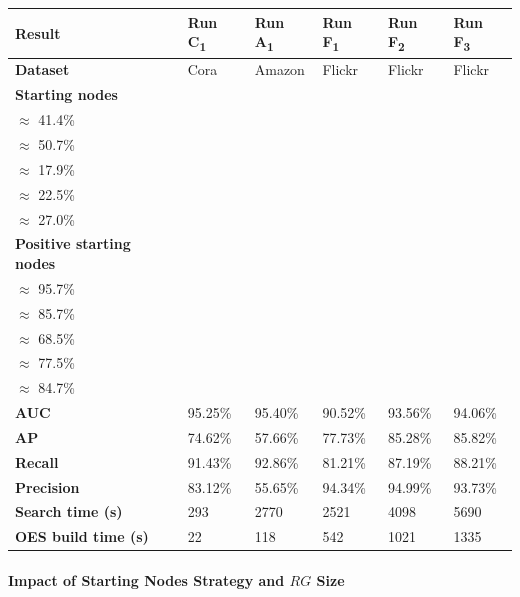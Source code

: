 \documentclass[pdflatex,sn-mathphys-num]{sn-jnl}%
\renewenvironment{table}[1][]%
{\tableorg[#1]%
\tablebodyfont%
\renewcommand\footnotetext[2][]{{\removelastskip\vskip0pt%
\let\tablebodyfont\tablefootnotefont%
\hskip0pt\if!##1!\else{\smash{$^{##1}$}}\fi##2\par}}%
}{\endtableorg}
\theoremstyle{thmstyleone}%
\theoremstyle{thmstyletwo}%
\theoremstyle{thmstylethree}%
\begin{document}
\begin{table}[H]
\centering
\caption{Minomaly Results}
\label{tab:minomaly_results}
\scriptsize
\begin{tabular}{|p{45pt}|l|l|l|l|l|}
\hline
\textbf{Result} & \textbf{Run C\textsubscript{1}} & \textbf{Run A\textsubscript{1}} & \textbf{Run F\textsubscript{1}} & \textbf{Run F\textsubscript{2}} & \textbf{Run F\textsubscript{3}} \\ \hline
\textbf{Dataset}   & Cora           & Amazon         & Flickr         & Flickr         & Flickr         \\ \hline
\textbf{Starting nodes} & \makecell{$\frac{1120}{2708}$ \\ $\approx$ 41.4\%} & \makecell{$\frac{6977}{13752}$ \\ $\approx$ 50.7\%} & \makecell{$\frac{15988}{89250}$ \\ $\approx$ 17.9\%} & \makecell{$\frac{20057}{89250}$ \\ $\approx$ 22.5\%} & \makecell{$\frac{24074}{89250}$ \\ $\approx$ 27.0\%} \\ \hline
\textbf{Positive starting nodes} & \makecell{$\frac{67}{70}$ \\ $\approx$ 95.7\%} & \makecell{$\frac{300}{350}$ \\ $\approx$ 85.7\%} & \makecell{$\frac{1535}{2240}$ \\ $\approx$ 68.5\%} & \makecell{$\frac{1736}{2240}$ \\ $\approx$ 77.5\%} & \makecell{$\frac{1898}{2240}$ \\ $\approx$ 84.7\%} \\ \hline
\textbf{AUC} & 95.25\% & 95.40\% & 90.52\% & 93.56\% & 94.06\% \\ \hline
\textbf{AP} & 74.62\% & 57.66\% & 77.73\% & 85.28\% & 85.82\% \\ \hline
\textbf{Recall} & 91.43\% & 92.86\% & 81.21\% & 87.19\% & 88.21\% \\ \hline
\textbf{Precision} & 83.12\% & 55.65\% & 94.34\% & 94.99\% & 93.73\% \\ \hline
\textbf{Search time (s)} & 293 & 2770 & 2521 & 4098 & 5690 \\ \hline
\textbf{OES build time (s)} & 22 & 118 & 542 & 1021 & 1335 \\ \hline
\end{tabular}
\end{table}

\paragraph{Impact of Starting Nodes Strategy and $RG$ Size}
\end{document}

